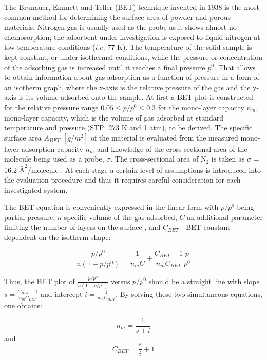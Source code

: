 The Brunauer, Emmett and Teller (BET) technique invented in 1938 is the most common method for determining the surface area of powder and porous materials.  Nitrogen gas is usually used as the probe as it shows almost no chemosorption; the adsorbent under investigation is exposed to liquid nitrogen at low temperature conditions ($i.e.$ 77 K). The temperature of the solid sample is kept constant, or under isothermal conditions, while the pressure or concentration of the adsorbing gas is increased until it reaches a final pressure \(p^0\).
That allows to obtain information about gas adsorption as a function of pressure in a form of an isotherm graph, where the x-axis is the relative pressure of the gas and the y-axis is its volume adsorbed onto the sample. At first a BET plot is constructed for the relative pressure range \(0.05 \le p/p^0 \le 0.3\) for the mono-layer capacity $n_m$, mono-layer capacity, which is the volume of gas adsorbed at standard temperature and pressure (STP: 273 K and 1 atm), to be derived. The specific surface area $A_{BET}$ $[g/m^2]$ of the material is evaluated from the measured mono-layer adsorption capacity $n_m$ and knowledge of the cross-sectional area of the molecule being used as a probe, $\sigma$. The cross-sectional area of N$_2$ is taken as $\sigma$ =  16.2 $\si{\angstrom}^2$/molecule \cite{Kumar}. 
At each stage a certain level of assumptions is introduced into the evaluation procedure and thus it requires careful consideration for each investigated system.

The BET equation is conveniently expressed in the linear form with $p/p^0$ being partial pressure, $n$ specific volume of the gas adsorbed, $C$ an additional parameter limiting the number of layers on the surface \cite{noauthor_adsorption_nodate}, and $C_{BET}$ - BET constant dependent on the isotherm shape: 

\begin{equation}
\frac{p/p^0}{n(1-p/p^0)}=\frac{1}{n_mC} + \frac{C_{BET}-1}{n_mC_{BET}}\frac{p}{p^0}
  \label{eq:Bsp_BET_plot}
\end{equation}

Thus, the BET plot of \( \frac{p/p^0}{n(1-p/p^0)} \) versus \(p/p^0\) should be a straight line with slope \(s = \frac{C_{BET}- 1}{n_m C_{BET}} \) and intercept \( i = \frac{1}{n_m C_{BET}} \). By solving these two simultaneous equations, one obtains: 

\begin{equation}
    n_m = \frac{1}{s + i}
\end{equation}
and
\begin{equation}
    C_{BET} = \frac{s}{i} + 1
\end{equation}

